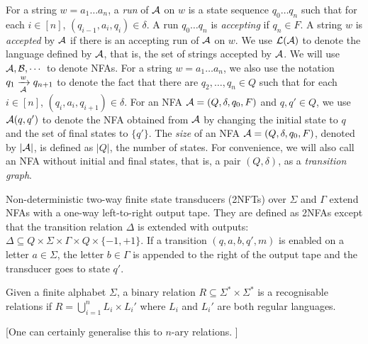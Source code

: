 \documentclass{llncs}
\newcommand{\tl}[1]{\color{blue} {TL: #1 :LT} \color{black}}
\newcommand{\tl}[1]{}
\begin{document}
For a string $w = a_1 \dots a_n$, a \emph{run} of $\mathcal{A}$ on $w$ is a state sequence $q_0 \dots q_n$ such that for each $i \in [n]$, $(q_{i-1}, a_i, q_i) \in \delta$. A run $q_0 \dots q_n$ is \emph{accepting} if $q_n \in F$. A string $w$ is \emph{accepted} by $\mathcal{A}$ if there is an accepting run of $\mathcal{A}$ on $w$. We use $\mathcal{L}(\mathcal{A})$ to denote the language defined by $\mathcal{A}$, that is, the set of strings accepted by $\mathcal{A}$. We will use $\mathcal{A}, \mathcal{B}, \cdots$ to denote NFAs. 
For a string $w= a_1 \dots a_n$, we also use the notation $q_1 \xrightarrow[\mathcal{A}]{w} q_{n+1}$ to denote the fact that there are $q_2,\dots, q_n \in Q$ such that for each $i \in [n]$, $(q_i, a_i, q_{i+1}) \in \delta$.  For an NFA $\mathcal{A}=(Q, \delta, q_0, F)$ and $q, q' \in Q$, we use $\mathcal{A}(q,q')$ to denote the NFA obtained from $\mathcal{A}$ by changing the initial state to $q$ and the set of final states to $\{q'\}$. The \emph{size} of an NFA $\mathcal{A}=(Q, \delta, q_0, F)$, denoted by $|\mathcal{A}|$, is defined as $|Q|$, the number of states. For convenience, we will also call an NFA without initial and final states, that is, a pair $(Q, \delta)$, as a \emph{transition graph}. 

\begin{definition}
  Non-deterministic two-way finite state transducers (2NFTs) over $\Sigma$ and $\Gamma$ extend NFAs with a one-way left-to-right output tape. They are defined as 2NFAs except that the transition relation $\Delta$ is extended with outputs: $\Delta\subseteq Q \times \Sigma \times \Gamma \times  Q \times \{-1, +1\}$. If a transition $(q, a, b, q′, m)$ is enabled on a letter $a\in \Sigma$, the letter $b\in \Gamma$ is appended to the right of
	the output tape and the transducer goes to state $q'$. 
\end{definition}




\begin{definition}
	Given a finite alphabet $\Sigma$, a binary relation $R\subseteq \Sigma^*\times \Sigma^*$ is a recognisable relations if $R=\bigcup_{i=1}^n L_i\times L_i'$ where $L_i$ and $L_i'$ are both regular languages. 
	
	[One can certainly generalise this to $n$-ary relations. ]
\end{definition}
\end{document}

